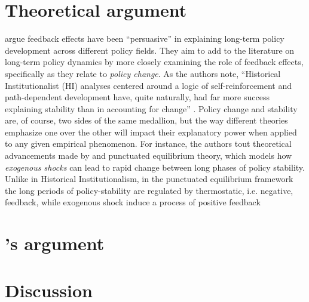 \documentclass[11pt, xcolor=dvipsnames]{article}
\begin{document}
\section*{Theoretical argument}
\textcite[][]{Jacobs2014} argue feedback effects have been \enquote{persuasive}  in explaining long-term policy development across different policy fields. They aim to add to the literature on long-term policy dynamics by more closely examining the role of feedback effects, specifically as they relate to \textit{policy change}. As the authors note, \enquote{Historical Institutionalist (HI) analyses centered around a logic of self-reinforcement and path-dependent development have, quite naturally, had far more success explaining stability than in accounting for change} \parencite[][p. 443]{Jacobs2014}. Policy change and stability are, of course, two sides of the same medallion, but the way different theories emphasize one over the other will impact their explanatory power when applied to any given empirical phenomenon. For instance, the authors tout theoretical advancements made by \textcite[][]{Baumgartner2002} and punctuated equilibrium theory, which models how \textit{exogenous shocks} can lead to rapid change between long phases of policy stability. Unlike in Historical Institutionalism, in the punctuated equilibrium framework the long periods of policy-stability are regulated by thermostatic, i.e. negative, feedback, while exogenous shock induce a process of positive feedback


\section*{\citeauthor[][]{Jacobs2014}'s \citeyear{Jacobs2014} argument}


\section*{Discussion}


\newpage
\newpage
\thispagestyle{empty}
\begingroup
{}
\printbibliography
\endgroup
\end{document}
